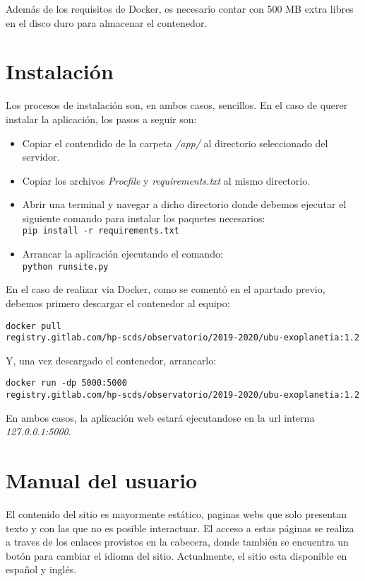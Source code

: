Además de los requisitos de Docker, es necesario contar con 500 MB extra libres en el disco duro para almacenar el contenedor.

\section{Instalación}

Los procesos de instalación son, en ambos casos, sencillos. En el caso de querer instalar la aplicación, los pasos a seguir son:

\begin{itemize}
    \item Copiar el contendido de la carpeta \textit{/app/} al directorio seleccionado del servidor.
    \item Copiar los archivos \textit{Procfile} y \textit{requirements.txt} al mismo directorio.
    \item Abrir una terminal y navegar a dicho directorio donde debemos ejecutar el siguiente comando para instalar los paquetes necesarios:\\
    \texttt{pip install -r requirements.txt}
    \item Arrancar la aplicación ejecutando el comando:\\
    \texttt{python runsite.py}
\end{itemize}

En el caso de realizar via Docker, como se comentó en el apartado previo, debemos primero descargar el contenedor al equipo:

\texttt{docker pull \\ registry.gitlab.com/hp-scds/observatorio/2019-2020/ubu-exoplanetia:1.2}

Y, una vez descargado el contenedor, arrancarlo:

\texttt{docker run -dp 5000:5000 \\ registry.gitlab.com/hp-scds/observatorio/2019-2020/ubu-exoplanetia:1.2}

En ambos casos, la aplicación web estará ejecutandose en la url interna \textit{127.0.0.1:5000}.

\section{Manual del usuario}

El contenido del sitio es mayormente estático, paginas webs que solo presentan texto y con las que no es posible interactuar. El acceso a estas páginas se realiza a traves de los enlaces provistos en la cabecera, donde también se encuentra un botón para cambiar el idioma del sitio. Actualmente, el sitio esta disponible en español y inglés.

